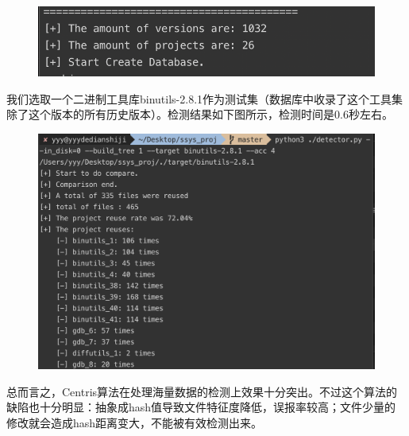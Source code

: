 \documentclass{cjc}
\begin{document}
\begin{figure}[htb]
  \centering
  \includegraphics[width=\linewidth]{pics/biggest_dbs.png}
\end{figure}

我们选取一个二进制工具库binutils-2.8.1作为测试集（数据库中收录了这个工具集除了这个版本的所有历史版本）。检测结果如下图所示，检测时间是0.6秒左右。

\begin{figure}[htb]
  \centering
  \includegraphics[width=\linewidth]{pics/biggest_test.png}
\end{figure}

总而言之，Centris算法在处理海量数据的检测上效果十分突出。不过这个算法的缺陷也十分明显：抽象成hash值导致文件特征度降低，误报率较高；文件少量的修改就会造成hash距离变大，不能被有效检测出来。


\end{document}
